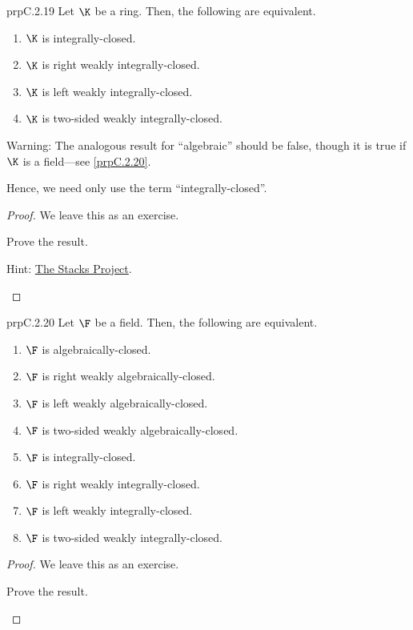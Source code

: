 \begin{prp}{}{prpC.2.19}
	Let $\K$ be a ring.  Then, the following are equivalent.
	\begin{enumerate}
		\item $\K$ is integrally-closed.
		\item $\K$ is right weakly integrally-closed.
		\item $\K$ is left weakly integrally-closed.
		\item $\K$ is two-sided weakly integrally-closed.
	\end{enumerate}
	\begin{rmk}
		Warning:  The analogous result for ``algebraic'' should be false, though it is true if $\K$ is a field---see \cref{prpC.2.20}.
	\end{rmk}
	\begin{rmk}
		Hence, we need only use the term ``integrally-closed''.
	\end{rmk}
	\begin{proof}
		We leave this as an exercise.
		\begin{exr}[breakable=false]{}{}
			Prove the result.
			\begin{rmk}
				Hint:  \href{http://stacks.math.columbia.edu/tag/0DCK}{The Stacks Project}.
			\end{rmk}
		\end{exr}
	\end{proof}
\end{prp}
\begin{prp}{}{prpC.2.20}
	Let $\F$ be a field.  Then, the following are equivalent.
	\begin{enumerate}
		\item $\F$ is algebraically-closed.
		\item $\F$ is right weakly algebraically-closed.
		\item $\F$ is left weakly algebraically-closed.
		\item $\F$ is two-sided weakly algebraically-closed.
		\item $\F$ is integrally-closed.
		\item $\F$ is right weakly integrally-closed.
		\item $\F$ is left weakly integrally-closed.
		\item $\F$ is two-sided weakly integrally-closed.
	\end{enumerate}
	\begin{proof}
		We leave this as an exercise.
		\begin{exr}[breakable=false]{}{}
			Prove the result.
		\end{exr}
	\end{proof}
\end{prp}
